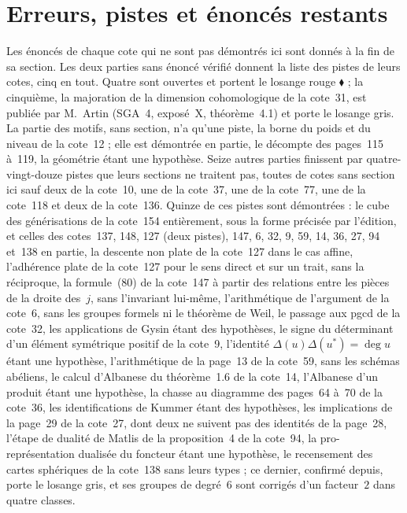 \section{Erreurs, pistes et énoncés restants}\label{sec:reste}

Les énoncés de chaque cote qui ne sont pas démontrés ici sont donnés à la fin de sa section. Les deux parties sans énoncé vérifié donnent la liste des pistes de leurs cotes, cinq en tout. Quatre sont ouvertes et portent le losange rouge \textcolor{piste}{\ensuremath{\blacklozenge}} ; la cinquième, la majoration de la dimension cohomologique de la cote~31, est publiée par M.~Artin (SGA~4, exposé~X, théorème~4.1) et porte le losange gris. La partie des motifs, sans section, n'a qu'une piste, la borne du poids et du niveau de la cote~12 ; elle est démontrée en partie, le décompte des pages~115 à~119, la géométrie étant une hypothèse. Seize autres parties finissent par quatre-vingt-douze pistes que leurs sections ne traitent pas, toutes de cotes sans section ici sauf deux de la cote~10, une de la cote~37, une de la cote~77, une de la cote~118 et deux de la cote~136. Quinze de ces pistes sont démontrées : le cube des générisations de la cote~154 entièrement, sous la forme précisée par l'édition, et celles des cotes~137, 148, 127 (deux pistes), 147, 6, 32, 9, 59, 14, 36, 27, 94 et~138 en partie, la descente non plate de la cote~127 dans le cas affine, l'adhérence plate de la cote~127 pour le sens direct et sur un trait, sans la réciproque, la formule~(80) de la cote~147 à partir des relations entre les pièces de la droite des~$j$, sans l'invariant lui-même, l'arithmétique de l'argument de la cote~6, sans les groupes formels ni le théorème de Weil, le passage aux pgcd de la cote~32, les applications de Gysin étant des hypothèses, le signe du déterminant d'un élément symétrique positif de la cote~9, l'identité $\Delta(u)\Delta(u^*) = \deg u$ étant une hypothèse, l'arithmétique de la page~13 de la cote~59, sans les schémas abéliens, le calcul d'Albanese du théorème~1.6 de la cote~14, l'Albanese d'un produit étant une hypothèse, la chasse au diagramme des pages~64 à~70 de la cote~36, les identifications de Kummer étant des hypothèses, les implications de la page~29 de la cote~27, dont deux ne suivent pas des identités de la page~28, l'étape de dualité de Matlis de la proposition~4 de la cote~94, la pro-représentation dualisée du foncteur étant une hypothèse, le recensement des cartes sphériques de la cote~138 sans leurs types ; ce dernier, confirmé depuis, porte le losange gris, et ses groupes de degré~6 sont corrigés d'un facteur~$2$ dans quatre classes.

